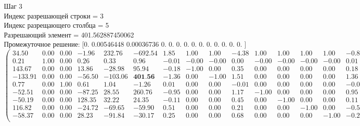 \documentclass{article}
\begin{document}
\begin{flushleft}
    Шаг 3\\
Индекс разрешающей строки = 3\\
Индекс разрещающего столбца = 5\\
Разрешающий элемент = 401.562887450062\\
Промежуточное решение:
 [0.         0.00546448 0.00036736 0.         0.         0.
 0.         0.         0.         0.         0.         0.
 0.         0.        ]
\begin{equation*}
\begin{pmatrix}
   34.50 & 0.00 & 0.00 &  -1.96 &  232.76 & -692.54 &  1.85 &  1.00 &  1.00 & -4.38 &  1.00 &  1.00 &  1.00 &  1.00 & -0.85 & 0.00 & 0.00 &  5.38 & 0.00 & 0.00 & 0.00 & 0.00 & -3.48 \\
    0.21 & 1.00 & 0.00 &   0.26 &    0.33 &    0.96 & -0.01 & -0.00 & -0.00 &  0.00 & -0.00 & -0.00 & -0.00 & -0.00 &  0.01 & 0.00 & 0.00 &  0.00 & 0.00 & 0.00 & 0.00 & 0.00 &  0.01 \\
  143.67 & 0.00 & 0.00 &  13.86 &  -28.98 &   95.94 & -0.18 & -1.00 &  0.00 &  0.35 &  0.00 &  0.00 &  0.00 &  0.00 &  0.18 & 1.00 & 0.00 & -0.35 & 0.00 & 0.00 & 0.00 & 0.00 &  0.83 \\
 -133.91 & 0.00 & 0.00 & -56.50 & -103.06 &  \textbf{401.56} & -1.36 &  0.00 & -1.00 &  1.51 &  0.00 &  0.00 &  0.00 &  0.00 &  1.36 & 0.00 & 1.00 & -1.51 & 0.00 & 0.00 & 0.00 & 0.00 &  0.85 \\
    0.77 & 0.00 & 1.00 &   0.61 &    1.04 &   -1.26 &  0.01 &  0.00 &  0.00 & -0.01 &  0.00 &  0.00 &  0.00 &  0.00 & -0.01 & 0.00 & 0.00 &  0.01 & 0.00 & 0.00 & 0.00 & 0.00 &  0.00 \\
  -52.51 & 0.00 & 0.00 & -87.25 &   28.55 &  260.76 & -0.95 &  0.00 &  0.00 &  1.17 & -1.00 &  0.00 &  0.00 &  0.00 &  0.95 & 0.00 & 0.00 & -1.17 & 1.00 & 0.00 & 0.00 & 0.00 &  0.79 \\
  -50.19 & 0.00 & 0.00 & 128.35 &   32.22 &   24.35 & -0.11 &  0.00 &  0.00 &  0.45 &  0.00 & -1.00 &  0.00 &  0.00 &  0.11 & 0.00 & 0.00 & -0.45 & 0.00 & 1.00 & 0.00 & 0.00 &  0.66 \\
  116.82 & 0.00 & 0.00 & -24.72 &  -69.65 &  -59.90 &  0.51 &  0.00 &  0.00 &  0.21 &  0.00 &  0.00 & -1.00 &  0.00 & -0.51 & 0.00 & 0.00 & -0.21 & 0.00 & 0.00 & 1.00 & 0.00 &  0.27 \\
  -58.37 & 0.00 & 0.00 &  28.23 &  -91.84 &  -30.17 &  0.25 &  0.00 &  0.00 &  0.68 &  0.00 &  0.00 &  0.00 & -1.00 & -0.25 & 0.00 & 0.00 & -0.68 & 0.00 & 0.00 & 0.00 & 1.00 &  0.07 \\
\end{pmatrix}
\end{equation*}
\end{flushleft}
\end{document}
